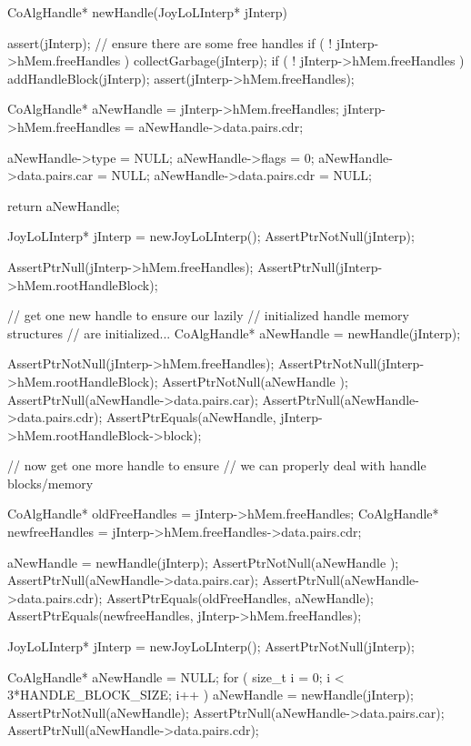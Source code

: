 \startCCode
CoAlgHandle* newHandle(JoyLoLInterp* jInterp) {
  assert(jInterp);
  // ensure there are some free handles
  if ( ! jInterp->hMem.freeHandles ) collectGarbage(jInterp);
  if ( ! jInterp->hMem.freeHandles ) addHandleBlock(jInterp);
  assert(jInterp->hMem.freeHandles);

  CoAlgHandle* aNewHandle   = jInterp->hMem.freeHandles;
  jInterp->hMem.freeHandles = aNewHandle->data.pairs.cdr;

  aNewHandle->type        = NULL;
  aNewHandle->flags       = 0;
  aNewHandle->data.pairs.car = NULL;
  aNewHandle->data.pairs.cdr = NULL;

  return aNewHandle;
}
\stopCCode

\startCTest
  JoyLoLInterp* jInterp = newJoyLoLInterp();
  AssertPtrNotNull(jInterp);

  AssertPtrNull(jInterp->hMem.freeHandles);
  AssertPtrNull(jInterp->hMem.rootHandleBlock);

  // get one new handle to ensure our lazily
  // initialized handle memory structures 
  // are initialized...
  CoAlgHandle* aNewHandle = newHandle(jInterp);

  AssertPtrNotNull(jInterp->hMem.freeHandles);
  AssertPtrNotNull(jInterp->hMem.rootHandleBlock);
  AssertPtrNotNull(aNewHandle );
  AssertPtrNull(aNewHandle->data.pairs.car);
  AssertPtrNull(aNewHandle->data.pairs.cdr);
  AssertPtrEquals(aNewHandle,
    jInterp->hMem.rootHandleBlock->block);

  // now get one more handle to ensure
  // we can properly deal with handle blocks/memory
  
  CoAlgHandle* oldFreeHandles =
    jInterp->hMem.freeHandles;
  CoAlgHandle* newfreeHandles = 
    jInterp->hMem.freeHandles->data.pairs.cdr;

  aNewHandle = newHandle(jInterp);
  AssertPtrNotNull(aNewHandle );
  AssertPtrNull(aNewHandle->data.pairs.car);
  AssertPtrNull(aNewHandle->data.pairs.cdr);
  AssertPtrEquals(oldFreeHandles, aNewHandle);
  AssertPtrEquals(newfreeHandles, jInterp->hMem.freeHandles);
\stopCTest
\stopTestCase


\startCTest
  JoyLoLInterp* jInterp = newJoyLoLInterp();
  AssertPtrNotNull(jInterp);

  CoAlgHandle* aNewHandle = NULL;
  for ( size_t i = 0; i < 3*HANDLE_BLOCK_SIZE; i++ ) {
    aNewHandle = newHandle(jInterp);
  }
  AssertPtrNotNull(aNewHandle);
  AssertPtrNull(aNewHandle->data.pairs.car);
  AssertPtrNull(aNewHandle->data.pairs.cdr);
\stopCTest
\stopTestCase
\stopTestSuite

